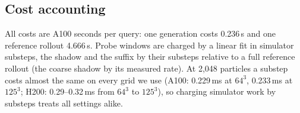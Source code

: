 \subsection{Cost accounting}
\label{sec:cost}
All costs are A100 seconds per query: one generation costs 0.236\,s and one reference rollout 4.666\,s.
Probe windows are charged by a linear fit in simulator substeps, the shadow and the suffix by their substeps relative to a full reference rollout (the coarse shadow by its measured rate).
At 2{,}048 particles a substep costs almost the same on every grid we use (A100: 0.229\,ms at $64^3$, 0.233\,ms at $125^3$; H200: 0.29--0.32\,ms from $64^3$ to $125^3$), so charging simulator work by substeps treats all settings alike.
